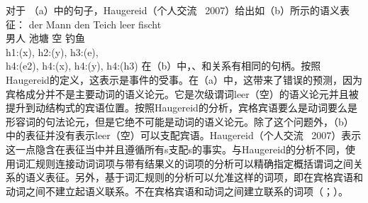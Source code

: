 \begin{exe}
\begin{xlist}[iv.]
\begin{exe}
\begin{xlist}[iv.]
对于 （a）中的句子，Haugereid（个人交流 \, 2007）给出如（b）所示的语义表征：
\eal
\ex 
\gll der Mann den Teich leer fischt\\
	  男人  池塘 空 钓鱼\\
\ex h1:(x), h2:(y), h3:(e),\\
    h4:(e2), h4:(x), h4:(y), h4:(h3)
\zl
在（b）中，、和关系有相同的句柄。按照Haugereid的定义，这表示是事件的受事。在（a）中，这带来了错误的预测，因为宾格成分并不是主要动词的语义论元。它是次级谓词leer（空）的语义论元并且被提升到动结构式的宾语位置。按照Haugereid的分析，宾格宾语要么是动词要么是形容词的句法论元，但是它绝不可能是动词的语义论元。除了这个问题外，（b）中的表征并没有表示leer（空）可以支配宾语。Haugereid（个人交流 \, 2007）表示这一点隐含在表征当中并且遵循所有s支配s的事实。与Haugereid的分析不同，使用词汇规则连接动词词项与带有结果义的词项的分析可以精确指定概括谓词之间关系的语义表征。另外，基于词汇规则的分析可以允准这样的词项，即在宾格宾语和动词之间不建立起语义联系。不在宾格宾语和动词之间建立联系的词项（\citealp{Wechsler97a,WN2001a}；\citealp[\S~5]{Mueller2002b}）。

\end{xlist}
\end{exe}
\end{xlist}
\end{exe}
